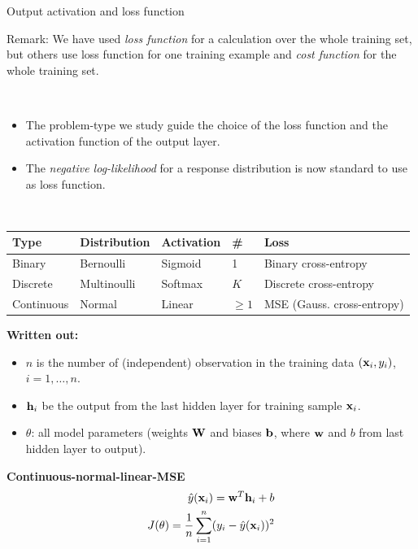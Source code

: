 \documentclass[
  ignorenonframetext,
]{beamer}
\providecommand{\tightlist}{%
  \setlength{\itemsep}{0pt}\setlength{\parskip}{0pt}}
\begin{document}
\begin{frame}
\begin{block}{Output activation and loss function}
\protect\hypertarget{output-activation-and-loss-function}{}
\(~\)

Remark: We have used \emph{loss function} for a calculation over the
whole training set, but others use loss function for one training
example and \emph{cost function} for the whole training set.

\(~\)

\begin{itemize}
\tightlist
\item
  The problem-type we study guide the choice of the loss function and
  the activation function of the output layer.
\item
  The \emph{negative log-likelihood} for a response distribution is now
  standard to use as loss function.
\end{itemize}

\(~\)

\begin{longtable}[]{@{}lllll@{}}
\toprule
Type & Distribution & Activation & \# & Loss\tabularnewline
\midrule
\endhead
Binary & Bernoulli & Sigmoid & 1 & Binary cross-entropy\tabularnewline
Discrete & Multinoulli & Softmax & \(K\) & Discrete
cross-entropy\tabularnewline
Continuous & Normal & Linear & \(\ge 1\) & MSE (Gauss.
cross-entropy)\tabularnewline
\bottomrule
\end{longtable}
\end{block}
\end{frame}

\begin{frame}
\textbf{Written out:}

\begin{itemize}
\tightlist
\item
  \(n\) is the number of (independent) observation in the training data
  \(({\bf x}_i, y_i)\), \(i=1,\ldots,n\).
\item
  \({\bf h}_i\) be the output from the last hidden layer for training
  sample \({\bf x}_i\).
\item
  \({\theta}\): all model parameters (weights \({\bf W}\) and biases
  \({\bf b}\), where \({\bf w}\) and \(b\) from last hidden layer to
  output).
\end{itemize}

\textbf{Continuous-normal-linear-MSE} \begin{eqnarray*}
\hat{y}({\bf x}_i)={\bf w}^T {\bf h}_i+ b \\
J({\theta})=\frac{1}{n}\sum_{i=1}^n (y_i-{\hat{y}({\bf x}_i)})^2
\end{eqnarray*}
\end{frame}
\end{document}
